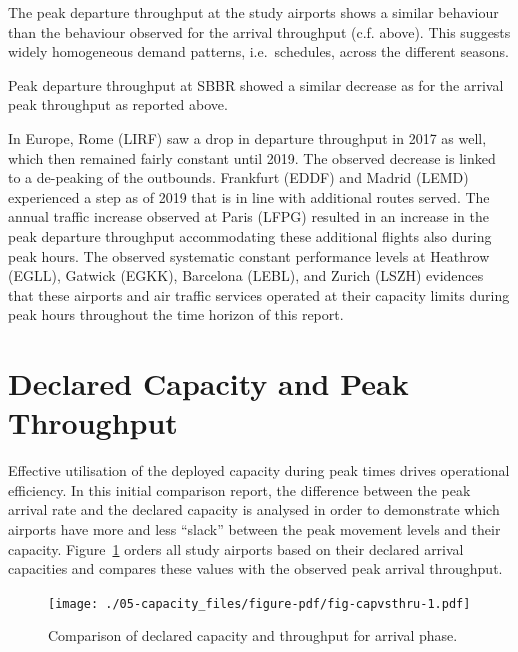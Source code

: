 \documentclass[
  a4paper,
  DIV=11,
  numbers=noendperiod]{scrreprt}
\begin{document}
The peak departure throughput at the study airports shows a similar
behaviour than the behaviour observed for the arrival throughput (c.f.
above). This suggests widely homogeneous demand patterns,
i.e.~schedules, across the different seasons.

Peak departure throughput at SBBR showed a similar decrease as for the
arrival peak throughput as reported above.

In Europe, Rome (LIRF) saw a drop in departure throughput in 2017 as
well, which then remained fairly constant until 2019. The observed
decrease is linked to a de-peaking of the outbounds. Frankfurt (EDDF)
and Madrid (LEMD) experienced a step as of 2019 that is in line with
additional routes served. The annual traffic increase observed at Paris
(LFPG) resulted in an increase in the peak departure throughput
accommodating these additional flights also during peak hours. The
observed systematic constant performance levels at Heathrow (EGLL),
Gatwick (EGKK), Barcelona (LEBL), and Zurich (LSZH) evidences that these
airports and air traffic services operated at their capacity limits
during peak hours throughout the time horizon of this report.

\hypertarget{declared-capacity-and-peak-throughput}{%
\section{Declared Capacity and Peak
Throughput}\label{declared-capacity-and-peak-throughput}}

Effective utilisation of the deployed capacity during peak times drives
operational efficiency. In this initial comparison report, the
difference between the peak arrival rate and the declared capacity is
analysed in order to demonstrate which airports have more and less
``slack'' between the peak movement levels and their capacity.
Figure~\ref{fig-capvsthru} orders all study airports based on their
declared arrival capacities and compares these values with the observed
peak arrival throughput.

\begin{figure}[h]

{\centering \texttt{[image: ./05-capacity\_files/figure-pdf/fig-capvsthru-1.pdf]}

}

\caption{\label{fig-capvsthru}Comparison of declared capacity and
throughput for arrival phase.}

\end{figure}
\end{document}
